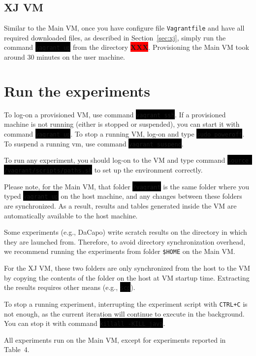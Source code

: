 \documentclass[12pt]{article}
\newcommand{\command}[1]{\colorbox{black}{\texttt{\color{white}#1}}}
\newcommand{\host}[1]{\colorbox{blue!20}{\texttt{\color{black}#1}}}
\newcommand{\XXX}{\colorbox{red}{\bf\color{white}XXX}}
\begin{document}
\subsection{XJ VM}

Similar to the Main VM, once you have configure file \host{Vagrantfile} and
have all required downloaded files, as described in Section~\ref{sec:xj}, simply
run the command \command{vagrant up} from the directory \XXX.  Provisioning the
Main VM took around 30 minutes on the user machine.

\section{Run the experiments}
\label{sec:run}

To log-on a provisioned VM, use command \command{vagrant ssh}.  If a provisioned
machine is not running (either is stopped or suspended), you can start it with
command \command{vagrant up}.  To stop a running VM, log-on and type \command{sudo
poweroff}.  To suspend a running vm, use command \command{vagrant suspend}.

To run any experiment, you should log-on to the VM and type command
\command{source /vagrant/scripts/paths.sh} to set up the environment correctly.

Please note, for the Main VM, that folder \command{/vagrant} is the same folder
where you typed \command{vagrant up} on the host machine, and any changes between
these folders are synchronized.  As a result, results and tables generated
inside the VM are automatically available to the host machine.

Some experiments (e.g., DaCapo) write scratch results on the directory in which
they are launched from.  Therefore, to avoid directory synchronization overhead,
we recommend running the experiments from folder \host{\$HOME} on the
Main VM.

For the XJ VM, these two folders are only synchronized from the host to the VM
by copying the contents of the folder on the host at VM startup time.
Extracting the results requires other means (e.g., \command{scp}).

To stop a running experiment, interrupting the experiment script with
\texttt{CTRL+C} is not enough, as the current iteration will continue to execute
in the background.  You can stop it with command \command{killall -KILL java}.

All experiments run on the Main VM, except for experiments reported in Table~4.
\end{document}
